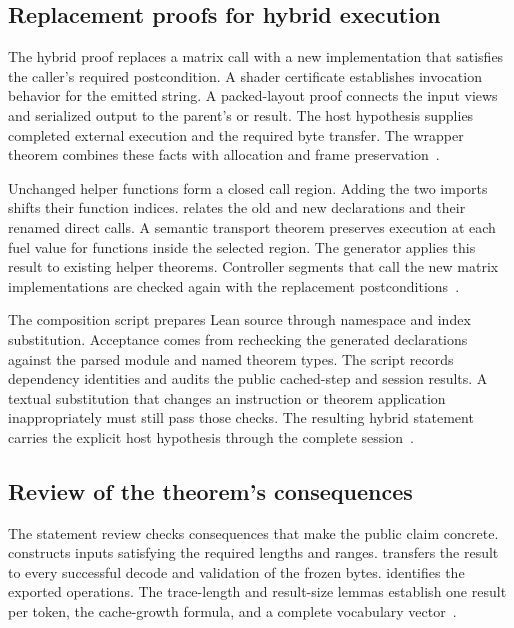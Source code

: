 \subsection{Replacement proofs for hybrid execution}

The hybrid proof replaces a matrix call with a new implementation that satisfies the caller's required postcondition.  A shader certificate establishes invocation behavior for the emitted string.  A packed-layout proof connects the input views and serialized output to the parent's  or  result.  The host hypothesis supplies completed external execution and the required byte transfer.  The wrapper theorem combines these facts with allocation and frame preservation~\cite{wg-packedshader,wg-backend}.

Unchanged helper functions form a closed call region.  Adding the two imports shifts their function indices.   relates the old and new declarations and their renamed direct calls.  A semantic transport theorem preserves execution at each fuel value for functions inside the selected region.  The generator applies this result to existing helper theorems.  Controller segments that call the new matrix implementations are checked again with the replacement postconditions~\cite{wg-transport,wg-composition}.

The composition script prepares Lean source through namespace and index substitution.  Acceptance comes from rechecking the generated declarations against the parsed module and named theorem types.  The script records dependency identities and audits the public cached-step and session results.  A textual substitution that changes an instruction or theorem application inappropriately must still pass those checks.  The resulting hybrid statement carries the explicit host hypothesis through the complete session~\cite{wg-composition}.

\subsection{Review of the theorem's consequences}

The statement review checks consequences that make the public claim concrete.   constructs inputs satisfying the required lengths and ranges.   transfers the result to every successful decode and validation of the frozen bytes.   identifies the exported operations.  The trace-length and result-size lemmas establish one result per token, the cache-growth formula, and a complete vocabulary vector~\cite{reviewlemmas}.

